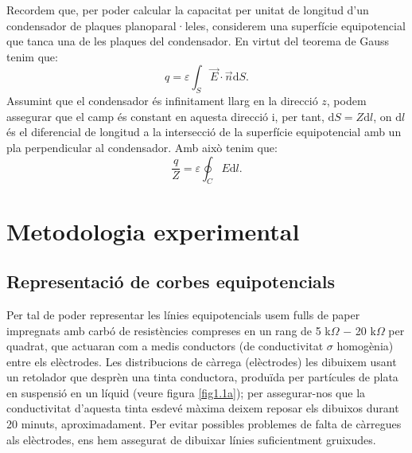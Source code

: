 \documentclass[a4paper,10.5pt]{report}
\begin{document}
Recordem que, per poder calcular la capacitat per unitat de longitud d'un condensador de plaques planoparal·leles, considerem una superfície equipotencial que tanca una de les plaques del condensador. En virtut del teorema de Gauss tenim que:
\begin{equation}
	q = \varepsilon \int_S \vec{E}\cdot \vec{n}\mathrm{d}S.
\end{equation}
Assumint que el condensador és infinitament llarg en la direcció $z$, podem assegurar que el camp és constant en aquesta direcció i, per tant, $\mathrm{d}S = Z\mathrm{d}l$, on $\mathrm{d}l$ és el diferencial de longitud a la intersecció de la superfície equipotencial amb un pla perpendicular al condensador. Amb això tenim que:
\begin{equation}
	\frac{q}{Z} = \varepsilon \oint_C E \mathrm{d}l \label{eq1.13}.
\end{equation}
\section{Metodologia experimental}
\subsection{Representació de corbes equipotencials}
Per tal de poder representar les línies equipotencials usem fulls de paper impregnats amb carbó de resistències compreses en un rang de 5 k$\Omega$ $-$ 20 k$\Omega$ per quadrat, que actuaran com a medis conductors (de conductivitat $\sigma$ homogènia) entre els elèctrodes. Les distribucions de càrrega (elèctrodes) les dibuixem usant un retolador que desprèn una tinta conductora, produïda per partícules de plata en suspensió en un líquid (veure figura \ref{fig1.1a}); per assegurar-nos que la conductivitat d'aquesta tinta esdevé màxima deixem reposar els dibuixos durant 20 minuts, aproximadament. Per evitar possibles problemes de falta de càrregues als elèctrodes, ens hem assegurat de dibuixar línies suficientment gruixudes.
\end{document}
